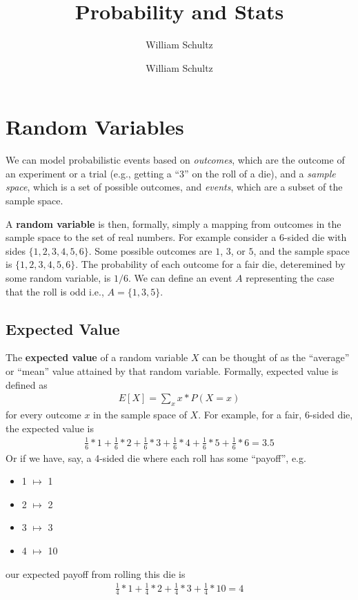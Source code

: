 \documentclass[10pt,a4paper]{article}
\author{William Schultz}
\begin{document}
\title{Probability and Stats}
\author{William Schultz}
\maketitle


\section{Random Variables}

We can model probabilistic events based on \textit{outcomes}, which are the outcome of an experiment or a trial (e.g., getting a ``3'' on the roll of a die), and a \textit{sample space}, which is a set of possible outcomes, and \textit{events}, which are a subset of the sample space. 

A \textbf{random variable} is then, formally, simply a mapping from outcomes in the sample space to the set of real numbers. For example consider a 6-sided die with sides $\{1,2,3,4,5,6\}$. Some possible outcomes are $1$, $3$, or $5$, and the sample space is $\{1,2,3,4,5,6\}$. The probability of each outcome for a fair die, deteremined by some random variable, is $1/6$. We can define an event $A$ representing the case that the roll is odd i.e., $A=\{1,3,5\}$.

\subsection{Expected Value}
The \textbf{expected value} of a random variable $X$ can be thought of as the ``average'' or ``mean'' value attained by that random variable. Formally, expected value is defined as
\begin{align*}
    E[X] = \sum_{x} x * P(X=x)
\end{align*}
for every outcome $x$ in the sample space of $X$. For example, for a fair, 6-sided die, the expected value is 
\begin{align*}
  \frac{1}{6}*1 + \frac{1}{6}*2 + \frac{1}{6}*3 + \frac{1}{6}*4 + \frac{1}{6}*5 + \frac{1}{6}*6 = 3.5
\end{align*}
Or if we have, say, a 4-sided die where each roll has some ``payoff'', e.g. 
\begin{itemize}
    \item 1 $\mapsto$ 1
    \item 2 $\mapsto$ 2
    \item 3 $\mapsto$ 3
    \item 4 $\mapsto$ 10
\end{itemize}
our expected payoff from rolling this die is
\begin{align*}
    \frac{1}{4}*1 + \frac{1}{4}*2 + \frac{1}{4}*3 + \frac{1}{4}*10 = 4
\end{align*}
\end{document}
